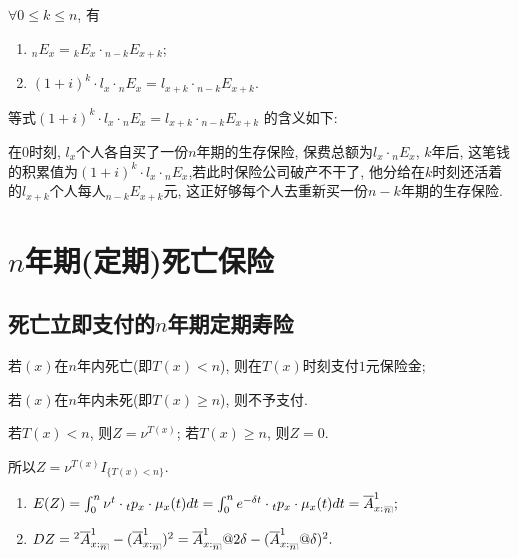 \documentclass[lang=cn,10pt]{elegantbook}
\makeatletter
\DeclareRobustCommand{\annu}[1]{_{%
    \def\arraystretch{0}%
    \setlength\arraycolsep{1pt}%
    \setlength\arrayrulewidth{.2pt}%
    \begin{array}[b]{@{}c|}\hline
        \\[\arraycolsep]%
        \scriptstyle #1%
    \end{array}%
}}
\makeatother
\begin{document}
\begin{corollary}[精算现值的性质]
	$\forall 0\leqslant k\leqslant n$, 有
	\begin{enumerate}
		\item $_nE_x={}_kE_x\cdot {}_{n-k}E_{x+k}$;
		\item $(1+i)^k\cdot l_x\cdot{}_nE_x=l_{x+k}\cdot {}_{n-k}E_{x+k}$.
	\end{enumerate}
\end{corollary}

\begin{remark}
    等式$(1+i)^k\cdot l_x\cdot {}_nE_x=l_{x+k}\cdot {}_{n-k}E_{x+k}$ 的含义如下:

    在$0$时刻, $l_x$个人各自买了一份$n$年期的生存保险, 保费总额为$l_x\cdot {}_nE_x$, $k$年后, 这笔钱的积累值为$(1+i)^k\cdot l_x\cdot {}_nE_x$,若此时保险公司破产不干了, 他分给在$k$时刻还活着的$l_{x+k}$个人每人${}_{n-k}E_{x+k}$元, 这正好够每个人去重新买一份$n-k$年期的生存保险.
\end{remark}

\section{$n$年期(定期)死亡保险}

\subsection{死亡立即支付的$n$年期定期寿险}
\begin{definition}[支付现值]
	若$(x)$在$n$年内死亡(即$T(x)<n$), 则在$T(x)$时刻支付$1$元保险金;

若$(x)$在$n$年内未死(即$T(x)\geqslant n$), 则不予支付.

若$T(x)<n$, 则$Z=\nu^{T(x)}$; 若$T(x)\geqslant n$, 则$Z=0$.

所以$Z=\nu^{T(x)}I_{\{T(x)<n\}}.$
\end{definition}

\begin{proposition}[精算现值与方差]
	\begin{enumerate}
		\item $E(Z)=\int_0^{n}{\nu^{t}\cdot {}_tp_x\cdot \mu_{x}(t)dt}=\int_0^{n}{e^{-\delta t}\cdot {}_tp_x\cdot \mu_{x}(t)dt}=\overline{A}_{x:}^1{}_{{}\annu{n}};$
		\item $DZ={}^2\overline{A}_{x:\annu{n}}^1-(\overline{A}_{x:\annu{n}}^1)^2=\overline{A}_{x:\annu{n}}^1@2\delta-(\overline{A}_{x:\annu{n}}^1@\delta)^2.$
	\end{enumerate}
\end{proposition}
\end{document}
